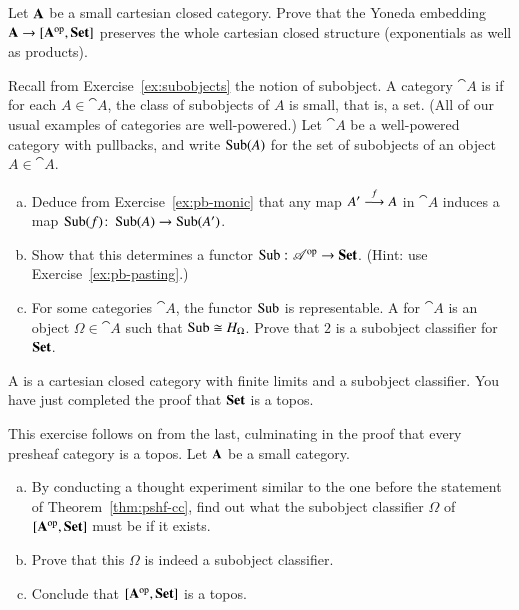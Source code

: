 \begin{question}
Let $\mathbf{A}$ be a small cartesian closed category.  Prove that the
Yoneda%
%
%
%
embedding $\mathbf{A} \to [\mathbf{A}^{\mathrm{op}},\mathbf{Set}]$ preserves the whole cartesian
closed structure (exponentials as well as products).
\end{question}


\begin{question}
\label{ex:soc}
Recall from Exercise~\ref{ex:subobjects} the notion of subobject.  A
category $\cat{A}$ is %
%
%
%
if for each $A \in \cat{A}$, the class of subobjects of $A$ is small, that
is, a set.  (All of our usual examples of categories are well-powered.)
Let $\cat{A}$ be a well-powered category with pullbacks, and write
$\operatorname{Sub}(A)$ for the set of subobjects of an object $A \in \cat{A}$.
%
\begin{enumerate}[(b)]
\item
Deduce from Exercise~\ref{ex:pb-monic} that any map $A' \stackrel{f}{\longrightarrow} A$ in
$\cat{A}$ induces a map $\Sub(f)\from \Sub(A) \to \Sub(A')$.

\item
Show that this determines a functor $\Sub\from \cat{A}^\op \to \Set$.
(Hint: use Exercise~\ref{ex:pb-pasting}.)

\item
For some categories $\cat{A}$, the functor $\operatorname{Sub}$ is representable.  A
 for $\cat{A}$ is an object $\Omega \in
\cat{A}$ such that $\operatorname{Sub} \cong H_\Omega$.  Prove that $2$ is a subobject
classifier for $\mathbf{Set}$.
\end{enumerate}
%
A %
%
%
is a cartesian closed category with finite limits and a subobject
classifier.  You have just completed the proof that $\mathbf{Set}$ is a topos.
\end{question}


\begin{question}
\label{ex:pshf-topos}
This exercise follows on from the last, culminating in the proof that every
presheaf category%
%
%
is a topos.%
%
%
Let $\mathbf{A}$ be a small category.
%
\begin{enumerate}[(b)]
\item
By conducting a thought%
%
%
experiment similar to the one before the statement of
Theorem~\ref{thm:pshf-cc}, find out what the subobject classifier $\Omega$
of $[\mathbf{A}^{\mathrm{op}},\mathbf{Set}]$ must be if it exists.

\item
Prove that this $\Omega$ is indeed a subobject classifier.

\item
Conclude that $[\mathbf{A}^{\mathrm{op}},\mathbf{Set}]$ is a topos.
\end{enumerate}
\end{question}
